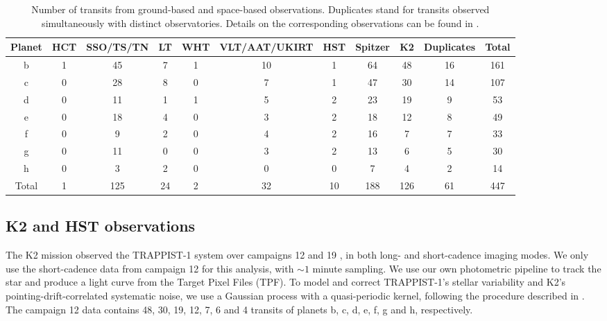 \documentclass[fleqn,usenatbib]{mnras} %
\begin{document}
\begin{table}
\centering                          
\begin{tabular}{c c c c c c c c c c c}        
\hline                
Planet  & HCT & SSO/TS/TN & LT & WHT & VLT/AAT/UKIRT & HST & Spitzer & K2 & Duplicates & Total  \\   
\hline                        
   b  & 1 & 45 & 7 & 1 & 10 & 1 & 64 & 48  & 16 & 161  \\      
   c  & 0 & 28 & 8 & 0 &  7 & 1 & 47 & 30  & 14 & 107  \\  
   d  & 0 & 11 & 1 & 1 &  5 & 2 & 23 & 19  & 9 & 53 \\  
   e  & 0 & 18 & 4 & 0 &  3 & 2 & 18 & 12  & 8 & 49 \\  
   f  & 0 &  9 & 2 & 0 &  4 & 2 & 16 &  7 & 7 & 33  \\  
   g  & 0 & 11 & 0 & 0 &  3 & 2 & 13 &  6 & 5 & 30  \\  
   h  & 0 &  3 & 2 & 0 &  0 & 0 & 7 &  4  & 2 & 14  \\
   \hline
Total & 1 & 125 & 24 & 2 &  32 & 10 & 188 & 126 & 61 & 447 \\
\hline 
\end{tabular}
\caption{Number of transits from ground-based and space-based observations. Duplicates stand for transits observed simultaneously with distinct observatories. Details on the corresponding observations can be found in \citet{Gillon2016,Gillon2017,Grimm2018,deWit2016,deWit2018,Delrez2018a,Ducrot2018,Burdanov2019,Ducrot2020}.}         
\label{tab:transit_time_list}
\end{table}

\subsection{K2 and HST observations}


The K2 mission \citep{Howell2014} observed the TRAPPIST-1 system over campaigns 12 and 19 \citep{Luger2017a}, in both long- and short-cadence imaging modes. We only use the short-cadence data from campaign 12 for this analysis, with $\sim1$ minute sampling. We use our own photometric pipeline to track the star and produce a light curve from the Target Pixel Files (TPF). To model and correct TRAPPIST-1's stellar variability and K2's pointing-drift-correlated systematic noise, we use a Gaussian process with a quasi-periodic kernel, following the procedure described in \cite{Grimm2018}. The campaign 12 data contains 48, 30, 19, 12, 7, 6 and 4 transits of planets b, c, d, e, f, g and h, respectively. %
\end{document}
